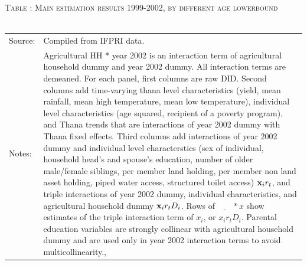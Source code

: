 \documentclass[12pt,letterpaper]{article}
\newcommand{\bfx}{\ensuremath{\mbox{\bf x}}}
\newcommand{\0}{\ensuremath{\mbox{\boldmath $0$}}}
\begin{document}
{\begin{table}\hfil\textsc{\footnotesize Table \thetable: Main estimation results 1999-2002, by different age lowerbound\label{MainByGenderByAgeLBResults}}\\\setlength{\tabcolsep}{.5pt}\renewcommand{\arraystretch}{.675}\hspace{-2em}\hfil\\\renewcommand{\arraystretch}{1}\hfil\begin{tabular}{>{\hfill\scriptsize}p{1cm}<{}>{\scriptsize}p{12cm}<{\hfill}} Source:& Compiled from IFPRI data. \\[-1ex] Notes:&   \textsf{Agricultural HH * year 2002} is an interaction term of agricultural household dummy and year 2002 dummy. All interaction terms are demeaned. For each panel, first columns are raw DID. Second columns add time-varying thana level characteristics (yield, mean rainfall, mean high temperature, mean low temperature), individual level characteristics (age squared, recipient of a poverty program), and \textsf{Thana trends} that are interactions of year 2002 dummy with Thana fixed effects. Third columns add interactions of year 2002 dummy and individual level characterstics (sex of individual, household head's and spouse's education, number of older male/female siblings, per member land holding, per member non land asset holding, piped water access, structured toilet access) $\bfx_{i}r_{t}$, and triple interactions of year 2002 dummy, individual characteristics, and agricultural household dummy $\bfx_{i}r_{t}D_{i}$. Rows of $\underline{\phantom{mm}}*x$ show estimates of the triple interaction term of $x_{i}$, or $x_{i}r_{t}D_{i}$. Parental education variables are strongly collinear with agricultural household dummy and are used only in year 2002 interaction terms to avoid multicollinearity., \\   \end{tabular} \end{table}


}
\end{document}
